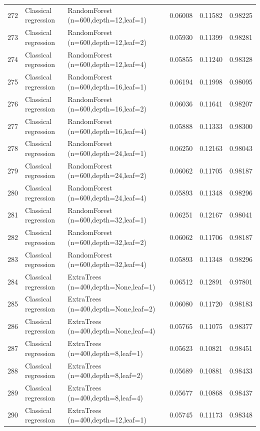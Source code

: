 \documentclass[10pt]{article}
\begin{document}
\begin{longtable}{C{0.75cm}L{2.35cm}L{8.0cm}C{1.15cm}C{1.15cm}C{1.15cm}}
272 & Classical regression & RandomForest (n=600,depth=12,leaf=1) & 0.06008 & 0.11582 & 0.98225 \\
273 & Classical regression & RandomForest (n=600,depth=12,leaf=2) & 0.05930 & 0.11399 & 0.98281 \\
274 & Classical regression & RandomForest (n=600,depth=12,leaf=4) & 0.05855 & 0.11240 & 0.98328 \\
275 & Classical regression & RandomForest (n=600,depth=16,leaf=1) & 0.06194 & 0.11998 & 0.98095 \\
276 & Classical regression & RandomForest (n=600,depth=16,leaf=2) & 0.06036 & 0.11641 & 0.98207 \\
277 & Classical regression & RandomForest (n=600,depth=16,leaf=4) & 0.05888 & 0.11333 & 0.98300 \\
278 & Classical regression & RandomForest (n=600,depth=24,leaf=1) & 0.06250 & 0.12163 & 0.98043 \\
279 & Classical regression & RandomForest (n=600,depth=24,leaf=2) & 0.06062 & 0.11705 & 0.98187 \\
280 & Classical regression & RandomForest (n=600,depth=24,leaf=4) & 0.05893 & 0.11348 & 0.98296 \\
281 & Classical regression & RandomForest (n=600,depth=32,leaf=1) & 0.06251 & 0.12167 & 0.98041 \\
282 & Classical regression & RandomForest (n=600,depth=32,leaf=2) & 0.06062 & 0.11706 & 0.98187 \\
283 & Classical regression & RandomForest (n=600,depth=32,leaf=4) & 0.05893 & 0.11348 & 0.98296 \\
284 & Classical regression & ExtraTrees (n=400,depth=None,leaf=1) & 0.06512 & 0.12891 & 0.97801 \\
285 & Classical regression & ExtraTrees (n=400,depth=None,leaf=2) & 0.06080 & 0.11720 & 0.98183 \\
286 & Classical regression & ExtraTrees (n=400,depth=None,leaf=4) & 0.05765 & 0.11075 & 0.98377 \\
287 & Classical regression & ExtraTrees (n=400,depth=8,leaf=1) & 0.05623 & 0.10821 & 0.98451 \\
288 & Classical regression & ExtraTrees (n=400,depth=8,leaf=2) & 0.05689 & 0.10881 & 0.98433 \\
289 & Classical regression & ExtraTrees (n=400,depth=8,leaf=4) & 0.05677 & 0.10868 & 0.98437 \\
290 & Classical regression & ExtraTrees (n=400,depth=12,leaf=1) & 0.05745 & 0.11173 & 0.98348 \\

\end{longtable}
\end{document}
